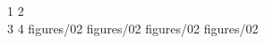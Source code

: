 \documentclass[version=3.12,american]{scrartcl}
\begin{document}
\begin{subfiglist*}[w=10cm]{1 2\\3 4}%
 {figures/02}
 {figures/02}
 {figures/02}
 {figures/02}
  
  
%
%
%


%
%
\end{subfiglist*}
\end{document}
